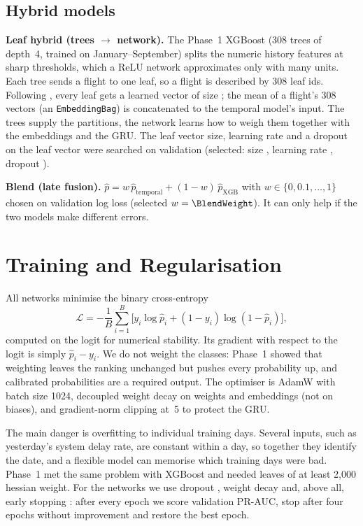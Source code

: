 \documentclass[conference]{IEEEtran}
\begin{document}
\subsection{Hybrid models}
\textbf{Leaf hybrid (trees $\rightarrow$ network).} The Phase~1 XGBoost (308 trees of
depth~4, trained on January--September) splits the numeric history features at sharp
thresholds, which a ReLU network approximates only with many units. Each tree sends a
flight to one leaf, so a flight is described by 308 leaf ids. Following
\cite{he2014facebook,ke2019deepgbm}, every leaf gets a learned vector of size
\LeafDim; the mean of a flight's 308 vectors (an \texttt{EmbeddingBag}) is concatenated
to the temporal model's input. The trees supply the partitions, the network learns how
to weigh them together with the embeddings and the GRU. The leaf vector size, learning
rate and a dropout on the leaf vector were searched on validation
(selected: size \LeafDim, learning rate \LeafLR, dropout \LeafDropout).

\textbf{Blend (late fusion).} $\hat p = w\,\hat p_{\text{temporal}} +
(1-w)\,\hat p_{\text{XGB}}$ with $w\in\{0,0.1,\dots,1\}$ chosen on validation log loss
(selected $w=\BlendWeight$). It can only help if the two models make different errors.

\section{Training and Regularisation}
All networks minimise the binary cross-entropy
\begin{equation}
\mathcal{L} = -\frac{1}{B}\sum_{i=1}^{B}\big[y_i\log\hat p_i + (1-y_i)\log(1-\hat p_i)\big],
\end{equation}
computed on the logit for numerical stability. Its gradient with respect to the logit is
simply $\hat p_i - y_i$. We do not weight the classes: Phase~1 showed that weighting
leaves the ranking unchanged but pushes every probability up, and calibrated
probabilities are a required output. The optimiser is AdamW
\cite{loshchilov2019adamw} with batch size 1024, decoupled weight decay on weights and
embeddings (not on biases), and gradient-norm clipping at~5 to protect the GRU.

The main danger is overfitting to individual training days. Several inputs, such as
yesterday's system delay rate, are constant within a day, so together they identify the
date, and a flexible model can memorise which training days were bad. Phase~1 met the
same problem with XGBoost and needed leaves of at least 2{,}000 hessian weight. For the
networks we use dropout \cite{srivastava2014dropout}, weight decay and, above all, early
stopping \cite{prechelt1998}: after every epoch we score validation PR-AUC, stop after
four epochs without improvement and restore the best epoch.
\end{document}
